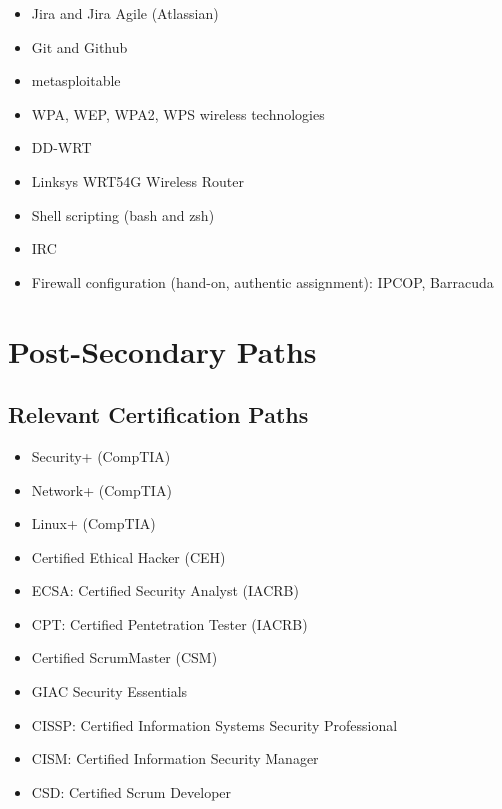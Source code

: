 \documentclass[letterpaper,10pt,english]{sphinxmanual}
\begin{document}
\begin{itemize}
\item {} 
Jira and Jira Agile (Atlassian)

\item {} 
Git and Github

\item {} 
metasploitable

\item {} 
WPA, WEP, WPA2, WPS wireless technologies

\item {} 
DD-WRT

\item {} 
Linksys WRT54G Wireless Router

\item {} 
Shell scripting (bash and zsh)

\item {} 
IRC

\item {} 
Firewall configuration (hand-on, authentic assignment): IPCOP, Barracuda

\end{itemize}


\section{Post-Secondary Paths}
\label{cybersecurity:post-secondary-paths}

\subsection{Relevant Certification Paths}
\label{cybersecurity:relevant-certification-paths}\begin{itemize}
\item {} 
Security+ (CompTIA)

\item {} 
Network+ (CompTIA)

\item {} 
Linux+ (CompTIA)

\item {} 
Certified Ethical Hacker (CEH)

\item {} 
ECSA: Certified Security Analyst (IACRB)

\item {} 
CPT: Certified Pentetration Tester (IACRB)

\item {} 
Certified ScrumMaster (CSM)

\item {} 
GIAC Security Essentials

\item {} 
CISSP: Certified Information Systems Security Professional

\item {} 
CISM: Certified Information Security Manager

\item {} 
CSD: Certified Scrum Developer

\end{itemize}
\end{document}

